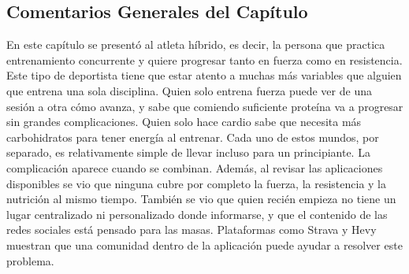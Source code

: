 \subsection{Comentarios Generales del Capítulo}
En este capítulo se presentó al atleta híbrido, es decir, la persona que practica entrenamiento concurrente y quiere progresar tanto en fuerza como en resistencia. Este tipo de deportista tiene que estar atento a muchas más variables que alguien que entrena una sola disciplina. Quien solo entrena fuerza puede ver de una sesión a otra cómo avanza, y sabe que comiendo suficiente proteína va a progresar sin grandes complicaciones. Quien solo hace cardio sabe que necesita más carbohidratos para tener energía al entrenar. Cada uno de estos mundos, por separado, es relativamente simple de llevar incluso para un principiante. La complicación aparece cuando se combinan. Además, al revisar las aplicaciones disponibles se vio que ninguna cubre por completo la fuerza, la resistencia y la nutrición al mismo tiempo. También se vio que quien recién empieza no tiene un lugar centralizado ni personalizado donde informarse, y que el contenido de las redes sociales está pensado para las masas. Plataformas como Strava y Hevy muestran que una comunidad dentro de la aplicación puede ayudar a resolver este problema.
